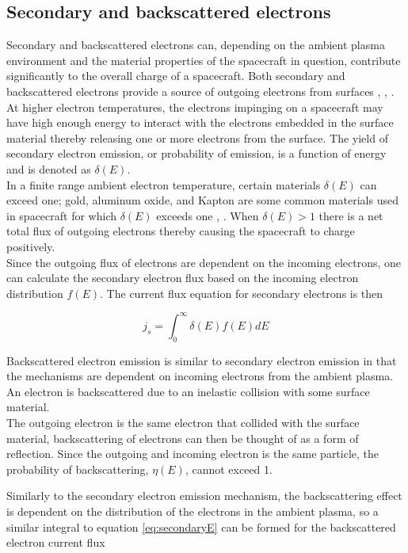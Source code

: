 \subsection*{Secondary and backscattered electrons}
Secondary and backscattered electrons can, depending on the ambient plasma environment and the material properties of the spacecraft in question, contribute significantly to the overall charge of a spacecraft. Both secondary and backscattered electrons provide a source of outgoing electrons from surfaces \parencite{LAI2019}, \parencite{Lai2005}, \parencite{Miloch2015}. 
\\
At higher electron temperatures, the electrons impinging on a spacecraft may have high enough energy to interact with the electrons embedded in the surface material thereby releasing one or more electrons from the surface. The yield of secondary electron emission, or probability of emission, is a function of energy and is denoted as $\delta(E)$. 
\\
In a finite range ambient electron temperature, certain materials $\delta(E)$ can exceed one; gold, aluminum oxide, and Kapton are some common materials used in spacecraft for which $\delta(E)$ exceeds one \parencite{Lai2006}, \parencite{LAI2019}. When $\delta(E) > 1$ there is a net total flux of outgoing electrons thereby causing the spacecraft to charge positively.  
\\
Since the outgoing flux of electrons are dependent on the incoming electrons, one can calculate the secondary electron flux based on the incoming electron distribution $f(E)$. The current flux equation for secondary electrons is then

\begin{equation}\label{eq:secondaryE}
    j_s = \int^{\infty}_0 \delta(E) f(E) dE
\end{equation}


Backscattered electron emission is similar to secondary electron emission in that the mechanisms are dependent on incoming electrons from the ambient plasma. An electron is backscattered due to an inelastic collision with some surface material. 
\\
The outgoing electron is the same electron that collided with the surface material, backscattering of electrons can then be thought of as a form of reflection. Since the outgoing and incoming electron is the same particle, the probability of backscattering, $\eta(E)$, cannot exceed 1. 

Similarly to the secondary electron emission mechanism, the backscattering effect is dependent on the distribution of the electrons in the ambient plasma, so a similar integral to equation \eqref{eq:secondaryE} can be formed for the backscattered electron current flux 

